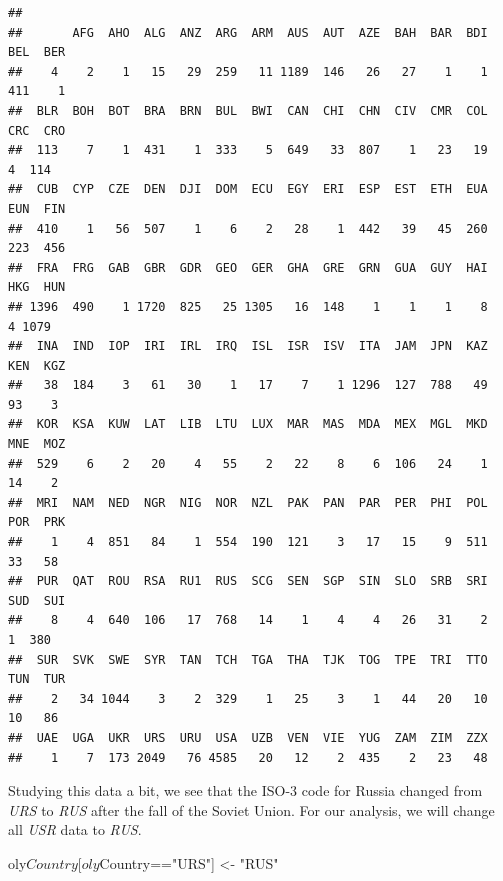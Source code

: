 \documentclass[]{book}
\newenvironment{Shaded}{\begin{snugshade}}{\end{snugshade}}
\newcommand{\KeywordTok}[1]{\textcolor[rgb]{0.13,0.29,0.53}{\textbf{{#1}}}}
\newcommand{\StringTok}[1]{\textcolor[rgb]{0.31,0.60,0.02}{{#1}}}
\newcommand{\NormalTok}[1]{{#1}}
\begin{document}
\begin{Shaded}
\end{Shaded}

\begin{verbatim}
## 
##       AFG  AHO  ALG  ANZ  ARG  ARM  AUS  AUT  AZE  BAH  BAR  BDI  BEL  BER 
##    4    2    1   15   29  259   11 1189  146   26   27    1    1  411    1 
##  BLR  BOH  BOT  BRA  BRN  BUL  BWI  CAN  CHI  CHN  CIV  CMR  COL  CRC  CRO 
##  113    7    1  431    1  333    5  649   33  807    1   23   19    4  114 
##  CUB  CYP  CZE  DEN  DJI  DOM  ECU  EGY  ERI  ESP  EST  ETH  EUA  EUN  FIN 
##  410    1   56  507    1    6    2   28    1  442   39   45  260  223  456 
##  FRA  FRG  GAB  GBR  GDR  GEO  GER  GHA  GRE  GRN  GUA  GUY  HAI  HKG  HUN 
## 1396  490    1 1720  825   25 1305   16  148    1    1    1    8    4 1079 
##  INA  IND  IOP  IRI  IRL  IRQ  ISL  ISR  ISV  ITA  JAM  JPN  KAZ  KEN  KGZ 
##   38  184    3   61   30    1   17    7    1 1296  127  788   49   93    3 
##  KOR  KSA  KUW  LAT  LIB  LTU  LUX  MAR  MAS  MDA  MEX  MGL  MKD  MNE  MOZ 
##  529    6    2   20    4   55    2   22    8    6  106   24    1   14    2 
##  MRI  NAM  NED  NGR  NIG  NOR  NZL  PAK  PAN  PAR  PER  PHI  POL  POR  PRK 
##    1    4  851   84    1  554  190  121    3   17   15    9  511   33   58 
##  PUR  QAT  ROU  RSA  RU1  RUS  SCG  SEN  SGP  SIN  SLO  SRB  SRI  SUD  SUI 
##    8    4  640  106   17  768   14    1    4    4   26   31    2    1  380 
##  SUR  SVK  SWE  SYR  TAN  TCH  TGA  THA  TJK  TOG  TPE  TRI  TTO  TUN  TUR 
##    2   34 1044    3    2  329    1   25    3    1   44   20   10   10   86 
##  UAE  UGA  UKR  URS  URU  USA  UZB  VEN  VIE  YUG  ZAM  ZIM  ZZX 
##    1    7  173 2049   76 4585   20   12    2  435    2   23   48
\end{verbatim}

Studying this data a bit, we see that the ISO-3 code for Russia changed
from \emph{URS} to \emph{RUS} after the fall of the Soviet Union. For
our analysis, we will change all \emph{USR} data to \emph{RUS}.

\begin{Shaded}
\begin{Highlighting}[]
\NormalTok{oly$Country[oly$Country==}\StringTok{"URS"}\NormalTok{] <-}\StringTok{ "RUS"}
\end{Highlighting}
\end{Shaded}
\end{document}

